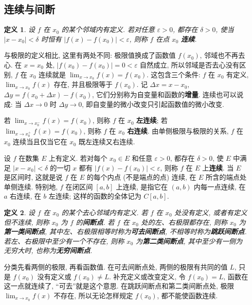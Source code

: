\documentclass[UTF8,openany]{ctexbook}
\theoremstyle{chinesetextbook}
\newtheorem{definition}{定义}[section]
\begin{document}
\subsection{连续与间断}
\begin{definition}
设 $f$ 在 $x_0$ 的某个邻域内有定义. 若对任意 $\varepsilon>0$, 都存在 $\delta>0$, 使当 $|x-x_0|<\delta$ 时恒有 $|f(x)-f(x_0)|<\varepsilon$, 则称 $f$ 在点 $x_0$ \textbf{连续}.
\end{definition}
与极限的定义相比, 这里有两处不同: 极限值换成了函数值 $f(x_0)$, 邻域也不再去心. 在 $x=x_0$ 处, $|f(x_0)-f(x_0)|=0<\varepsilon$ 自然成立, 所以邻域是否去心没有区别, $f$ 在 $x_0$ 连续就是 $\displaystyle\lim_{x\to x_0}f(x)=f(x_0)$. 这包含三个条件: $f$ 在 $x_0$ 有定义, $\displaystyle\lim_{x\to x_0}f(x)$ 存在, 并且极限等于 $f(x_0)$. 记 $\Delta x=x-x_0$, $\Delta y=f(x_0+\Delta x)-f(x_0)$, 它们分别称为自变量和函数的\textbf{增量}. 连续也可以说成: 当 $\Delta x\to0$ 时 $\Delta y\to0$, 即自变量的微小改变只引起函数值的微小改变.

若 $\displaystyle\lim_{x\to x_0^-}f(x)=f(x_0)$, 则称 $f$ 在 $x_0$ \textbf{左连续}; 若 $\displaystyle\lim_{x\to x_0^+}f(x)=f(x_0)$, 则称 $f$ 在 $x_0$ \textbf{右连续}. 由单侧极限与极限的关系, $f$ 在 $x_0$ 连续当且仅当它在 $x_0$ 既左连续又右连续.

设 $f$ 在数集 $E$ 上有定义. 若对每个 $x_0\in E$ 和任意 $\varepsilon>0$, 都存在 $\delta>0$, 使 $E$ 中满足 $|x-x_0|<\delta$ 的一切 $x$ 都有 $|f(x)-f(x_0)|<\varepsilon$, 则称 $f$ 在 $E$ 上\textbf{连续}. 当 $E$ 是区间时, 这就是说 $f$ 在 $E$ 的每个内点 (不是端点的点) 连续, 在 $E$ 所含的端点处单侧连续. 特别地, $f$ 在闭区间 $[a,b]$ 上连续, 是指它在 $(a,b)$ 内每一点连续, 在 $a$ 右连续, 在 $b$ 左连续; 这样的函数的全体记为 $C[a,b]$.
\begin{definition}
设 $f$ 在 $x_0$ 的某个去心邻域内有定义. 若 $f$ 在 $x_0$ 处没有定义, 或者有定义但不连续, 则称 $x_0$ 为 $f$ 的\textbf{间断点}. 若 $f$ 在 $x_0$ 处的左、右极限都存在, 则称 $x_0$ 为\textbf{第一类间断点}, 其中左、右极限相等时称为\textbf{可去间断点}, 不相等时称为\textbf{跳跃间断点}. 若左、右极限中至少有一个不存在, 则称 $x_0$ 为\textbf{第二类间断点}, 其中至少有一侧为无穷大时, 也称为\textbf{无穷间断点}.
\end{definition}
分类先看两侧的极限, 再看函数值. 在可去间断点处, 两侧的极限有共同的值 $L$, 只是 $f(x_0)$ 没有定义或 $f(x_0)\ne L$. 补充定义或改变定义, 令 $f(x_0)=L$, 函数在这一点就连续了, “可去”就是这个意思. 在跳跃间断点和第二类间断点处, 极限 $\displaystyle\lim_{x\to x_0}f(x)$ 不存在, 所以无论怎样规定 $f(x_0)$, 都不能使函数连续.
\end{document}
